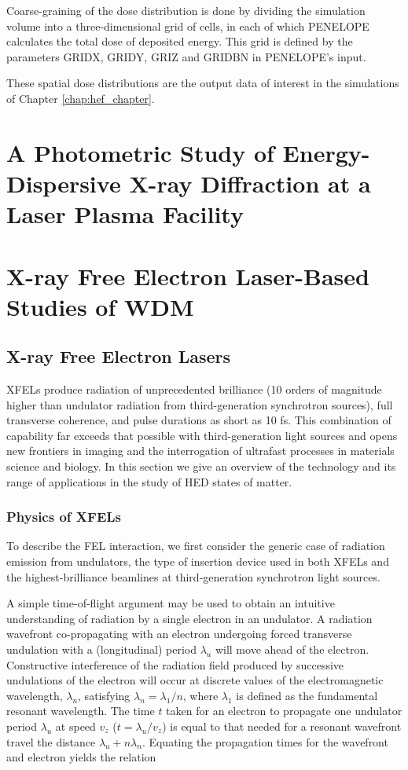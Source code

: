 \documentclass [11pt, proquest, article] {uwthesis}[2016/11/22]
\begin{document}
Coarse-graining of the dose distribution is done by dividing the simulation volume into a three-dimensional grid of cells, in each of which PENELOPE calculates the total dose of deposited energy. This grid is defined by the parameters GRIDX, GRIDY, GRIZ and GRIDBN in PENELOPE's input.

These spatial dose distributions are the output data of interest in the simulations of Chapter \ref{chap:hef_chapter}.



\chapter{A Photometric Study of Energy-Dispersive X-ray Diffraction at a Laser Plasma Facility}
\label{edxrd}


\chapter{X-ray Free Electron Laser-Based Studies of WDM}
\label{xfel_experiment}
\section{X-ray Free Electron Lasers}
XFELs produce radiation of unprecedented brilliance (10 orders of magnitude higher than undulator radiation from third-generation synchrotron sources), full transverse coherence, and pulse durations as short as 10 fs. This combination of capability far exceeds that possible with third-generation light sources and opens new frontiers in imaging and the interrogation of ultrafast processes in materials science and biology.
In this section we give an overview of the technology and its range of applications in the study of HED states of matter.

\subsection{Physics of XFELs}
To describe the FEL interaction, we first consider the generic case of radiation emission from undulators, the type of insertion device used in both XFELs and the highest-brilliance beamlines at third-generation synchrotron light sources.

A simple time-of-flight argument may be used to obtain an intuitive understanding of radiation by a single electron in an undulator. A radiation wavefront co-propagating with an electron undergoing forced transverse undulation with a (longitudinal) period $\lambda_u$ will move ahead of the electron. Constructive interference of the radiation field produced by successive undulations of the electron will occur at discrete values of the electromagnetic wavelength, $\lambda_n$, satisfying $\lambda_n = \lambda_1 / n$, where $\lambda_1$ is defined as the fundamental resonant wavelength. The time $t$ taken for an electron to propagate one undulator period $\lambda_u$ at speed $v_z$ ($t = \lambda_u/v_z$) is equal to that needed for a resonant wavefront travel the distance $\lambda_u + n \lambda_n$. Equating the propagation times for the wavefront and electron yields the relation \cite{mcneil2010x} 
\end{document}
